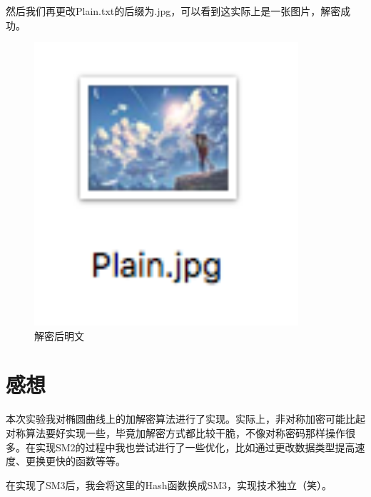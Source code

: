 \documentclass[11pt]{ctexart}
\begin{document}
然后我们再更改Plain.txt的后缀为.jpg，可以看到这实际上是一张图片，解密成功。
\begin{figure}
\centering
\includegraphics[width=9.8cm, height=10.5cm]{plain.png}
\caption{解密后明文}
\label{img_plain}
\end{figure}
\section{感想} %
本次实验我对椭圆曲线上的加解密算法进行了实现。实际上，非对称加密可能比起对称算法要好实现一些，毕竟加解密方式都比较干脆，不像对称密码那样操作很多。在实现SM2的过程中我也尝试进行了一些优化，比如通过更改数据类型提高速度、更换更快的函数等等。

在实现了SM3后，我会将这里的Hash函数换成SM3，实现技术独立（笑）。
\end{document}
